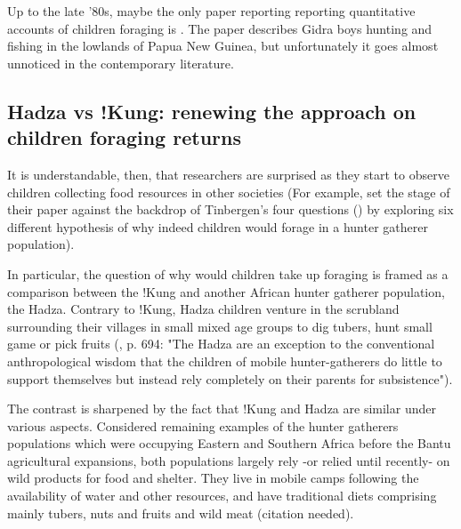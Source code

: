 Up to the late '80s, maybe the only paper reporting reporting quantitative accounts of children foraging is \cite{kawabe_development_1983}. The paper describes Gidra boys hunting and fishing in the lowlands of Papua New Guinea, but unfortunately it goes almost unnoticed in the contemporary literature. 

\subsection{Hadza vs !Kung: renewing the approach on children foraging returns}


It is understandable, then, that researchers are surprised as they start to observe children collecting food resources in other societies (For example, \cite{blurton_jones_why_1997} set the stage of their paper against the backdrop of Tinbergen's four questions (\cite{tinbergen_aims_1963}) by exploring six different hypothesis of why indeed children would forage in a hunter gatherer population). %

In particular, the question of why would children take up foraging is framed as a comparison between the !Kung and another African hunter gatherer population, the Hadza. Contrary to !Kung, Hadza children venture in the scrubland surrounding their villages in small mixed age groups to dig tubers, hunt small game or pick fruits  (\cite{hawkes_hadza_1995}, p. 694: "The Hadza are an exception to the conventional anthropological wisdom that the children of mobile hunter-gatherers do little to support themselves but instead rely completely on their parents for subsistence"). 

The contrast is sharpened by the fact that !Kung and Hadza are similar under various aspects. Considered remaining examples of the hunter gatherers populations which were occupying Eastern and Southern Africa before the Bantu agricultural expansions, both populations largely rely -or relied until recently- on wild products for food and shelter. They live in mobile camps following the availability of water and other resources, and have traditional diets comprising mainly tubers, nuts and fruits and wild meat (citation needed).

